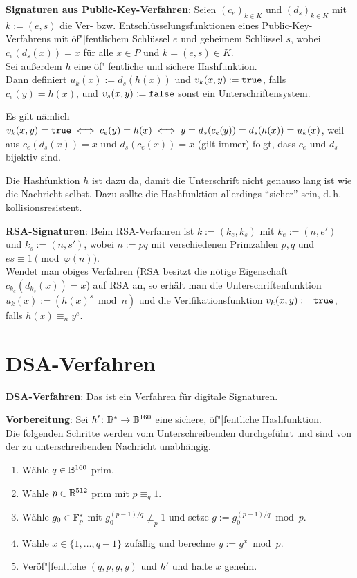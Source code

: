 \textbf{Signaturen aus Public-Key-Verfahren}:
Seien $(c_e)_{k \in K}$ und $(d_s)_{k \in K}$ mit $k := (e, s)$
die Ver- bzw. Entschlüsselungsfunktionen eines Public-Key-Verfahrens mit öf"|fentlichem Schlüssel $e$
und geheimem Schlüssel $s$, wobei $c_e(d_s(x)) = x$ für alle $x \in P$ und $k = (e, s) \in K$.\\
Sei außerdem $h$ eine öf"|fentliche und sichere Hashfunktion.\\
Dann definiert $u_k(x) := d_s(h(x))$ und $v_k(x, y) := \texttt{true}$, falls $c_e(y) = h(x)$,
und $v_s(x, y) := \texttt{false}$ sonst ein Unterschriftensystem.

Es gilt nämlich $v_k(x, y) = \texttt{true} \iff c_e(y) = h(x) \iff y = d_s(c_e(y)) = d_s(h(x)) = u_k(x)$,
weil aus $c_e(d_s(x)) = x$ und $d_s(c_e(x)) = x$ (gilt immer) folgt, dass $c_e$ und $d_s$ bijektiv
sind.

Die Hashfunktion $h$ ist dazu da, damit die Unterschrift nicht genauso lang ist wie die Nachricht
selbst.
Dazu sollte die Hashfunktion allerdings "`sicher"' sein, d.\,h. kollisionsresistent.

\linie

\textbf{RSA-Signaturen}:
Beim RSA-Verfahren ist $k := (k_e, k_s)$ mit $k_e := (n, e')$ und $k_s := (n, s')$,
wobei $n := pq$ mit verschiedenen Primzahlen $p, q$ und $es \equiv 1 \pmod{\varphi(n)}$.\\
Wendet man obiges Verfahren
(RSA besitzt die nötige Eigenschaft $c_{k_e}(d_{k_s}(x)) = x$) auf RSA an,
so erhält man die Unterschriftenfunktion $u_k(x) := (h(x)^s \bmod n)$ und
die Verifikationsfunktion $v_k(x, y) := \texttt{true}$, falls $h(x) \equiv_n y^e$.

\pagebreak

\section{%
    DSA-Verfahren%
}

\textbf{DSA-Verfahren}:
Das  ist ein Verfahren für
digitale Signaturen.

\textbf{Vorbereitung}:
Sei $h'\colon \mathbb{B}^\ast \to \mathbb{B}^{160}$ eine sichere, öf"|fentliche Hashfunktion.\\
Die folgenden Schritte werden vom Unterschreibenden durchgeführt und sind von der zu
unterschreibenden Nachricht unabhängig.
\begin{enumerate}
    \item
    Wähle $q \in \mathbb{B}^{160}$ prim.

    \item
    Wähle $p \in \mathbb{B}^{512}$ prim mit $p \equiv_q 1$.

    \item
    Wähle $g_0 \in \mathbb{F}_p^\ast$ mit $g_0^{(p-1)/q} \not\equiv_p 1$ und setze
    $g := g_0^{(p-1)/q} \bmod p$.

    \item
    Wähle $x \in \{1, \dotsc, q - 1\}$ zufällig und berechne $y := g^x \bmod p$.

    \item
    Veröf"|fentliche $(q, p, g, y)$ und $h'$ und halte $x$ geheim.
\end{enumerate}

